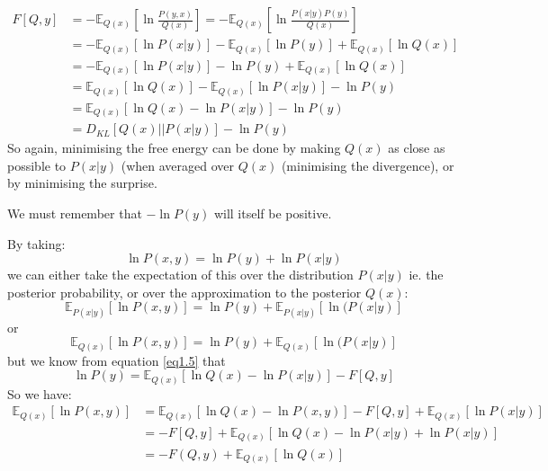 \documentclass[11pt,oneside]{memoir}
\begin{document}
\begin{align}
    F[Q,y]&=-\mathbb{E}_{Q(x)}\left[\ln\frac{P(y,x)}{Q(x)}\right]=-\mathbb{E}_{Q(x)}\left[\ln\frac{P(x|y)P(y)}{Q(x)}\right]\\
    &=-\mathbb{E}_{Q(x)}\left[\ln P(x|y)\right]-\mathbb{E}_{Q(x)}\left[\ln P(y)\right]+\mathbb{E}_{Q(x)}\left[\ln Q(x)\right] \\
    &=-\mathbb{E}_{Q(x)}\left[\ln P(x|y)\right]-\ln P(y)+\mathbb{E}_{Q(x)}\left[\ln Q(x)\right] \\
    &=\mathbb{E}_{Q(x)}\left[\ln Q(x)\right]-\mathbb{E}_{Q(x)}\left[\ln P(x|y)\right]-\ln P(y) \\
    &=\mathbb{E}_{Q(x)}\left[\ln Q(x)-\ln P(x|y)\right]-\ln P(y) \label{eq1.5}\\
    &=D_{KL}\left[Q(x)||P(x|y)\right]-\ln P(y)
\end{align}
So again, minimising the free energy can be done by making $Q(x)$ as close as possible to $P(x|y)$ (when averaged over $Q(x)$ (minimising the divergence), or by minimising the surprise.

We must remember that $-\ln P(y)$ will itself be positive.

By taking:
\begin{equation}\ln P(x,y)=\ln P(y)+\ln P(x|y)\end{equation}
we can either take the expectation of this over the distribution $P(x|y)$ ie. the posterior probability, or over the approximation to the posterior $Q(x)$:
\begin{equation}\label{eq1.7}\mathbb{E}_{P(x|y)}\left[\ln P(x,y)\right]=\ln P(y)+\mathbb{E}_{P(x|y)}\left[\ln(P(x|y)\right]\end{equation}
or
\begin{equation}
    \mathbb{E}_{Q(x)}\left[\ln P(x,y)\right]=\ln P(y)+\mathbb{E}_{Q(x)}\left[\ln(P(x|y)\right]
    \end{equation}
but we know from equation \ref{eq1.5} that
\begin{equation}
\ln P(y)=\mathbb{E}_{Q(x)}\left[\ln Q(x)-\ln P(x|y)\right]-F[Q,y]
\end{equation}
So we have:
\begin{align}
    \mathbb{E}_{Q(x)}\left[\ln P(x,y)\right]&=\mathbb{E}_{Q(x)}\left[\ln Q(x)-\ln P(x,y)\right]-F[Q,y]+\mathbb{E}_{Q(x)}\left[\ln P(x|y)\right]\\
    &=-F[Q,y]+\mathbb{E}_{Q(x)}\left[\ln Q(x)-\ln P(x|y)+\ln P(x|y)\right]\\
    &=-F(Q,y)+\mathbb{E}_{Q(x)}\left[\ln Q(x)\right]\label{eq1.11}
\end{align}
\end{document}
